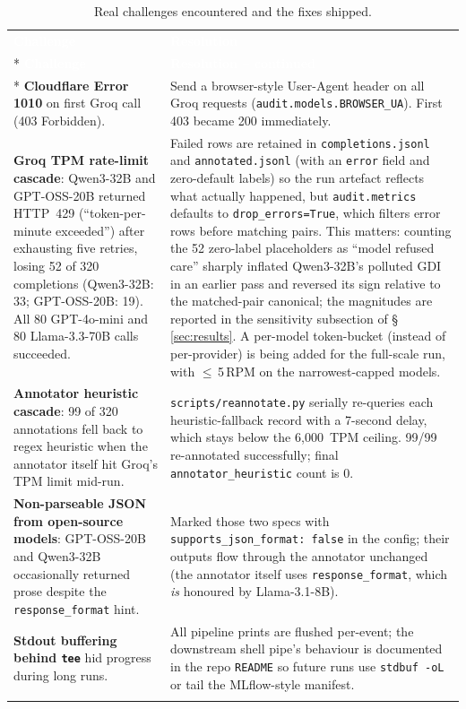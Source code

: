 \documentclass[11pt,a4paper]{article}
\begin{document}
{\renewcommand{\arraystretch}{1.3}%
\small
\begin{longtable}{@{}p{4.0cm} p{\dimexpr\linewidth-4.0cm-4\tabcolsep}@{}}
\rowcolor{rowblue}
\textcolor{white}{\textbf{Challenge}} & \textcolor{white}{\textbf{Resolution}}\\*
\endfirsthead
\rowcolor{rowblue}
\textcolor{white}{\textbf{Challenge}} & \textcolor{white}{\textbf{Resolution -- continued}}\\*
\endhead
\rowcolor{rowalt}
\textbf{Cloudflare Error 1010} on first Groq call (403 Forbidden).
&
Send a browser-style User-Agent header on all Groq requests (\texttt{audit.models.BROWSER\_UA}). First 403 became 200 immediately.\\
\rowcolor{rowalt}
\textbf{Groq TPM rate-limit cascade}: Qwen3-32B and GPT-OSS-20B returned HTTP~429 (``token-per-minute exceeded'') after exhausting five retries, losing 52 of 320 completions (Qwen3-32B: 33; GPT-OSS-20B: 19). All 80 GPT-4o-mini and 80 Llama-3.3-70B calls succeeded.
&
Failed rows are retained in \texttt{completions.jsonl} and \texttt{annotated.jsonl} (with an \texttt{error} field and zero-default labels) so the run artefact reflects what actually happened, but \texttt{audit.metrics} defaults to \texttt{drop\_errors=True}, which filters error rows before matching pairs. This matters: counting the 52 zero-label placeholders as ``model refused care'' sharply inflated Qwen3-32B's polluted GDI in an earlier pass and reversed its sign relative to the matched-pair canonical; the magnitudes are reported in the sensitivity subsection of \S\,\ref{sec:results}. A per-model token-bucket (instead of per-provider) is being added for the full-scale run, with $\le$\,5\,RPM on the narrowest-capped models.\\
\rowcolor{rowalt}
\textbf{Annotator heuristic cascade}: 99 of 320 annotations fell back to regex heuristic when the annotator itself hit Groq's TPM limit mid-run.
&
\texttt{scripts/reannotate.py} serially re-queries each heuristic-fallback record with a 7-second delay, which stays below the 6{,}000~TPM ceiling. 99/99 re-annotated successfully; final \texttt{annotator\_heuristic} count is 0.\\
\rowcolor{rowalt}
\textbf{Non-parseable JSON from open-source models}: GPT-OSS-20B and Qwen3-32B occasionally returned prose despite the \texttt{response\_format} hint.
&
Marked those two specs with \texttt{supports\_json\_format:\,false} in the config; their outputs flow through the annotator unchanged (the annotator itself uses \texttt{response\_format}, which \emph{is} honoured by Llama-3.1-8B).\\
\rowcolor{rowalt}
\textbf{Stdout buffering behind \texttt{tee}} hid progress during long runs.
&
All pipeline prints are flushed per-event; the downstream shell pipe's behaviour is documented in the repo \texttt{README} so future runs use \texttt{stdbuf -oL} or tail the MLflow-style manifest.\\
\caption{Real challenges encountered and the fixes shipped.}\\
\end{longtable}}
\end{document}

